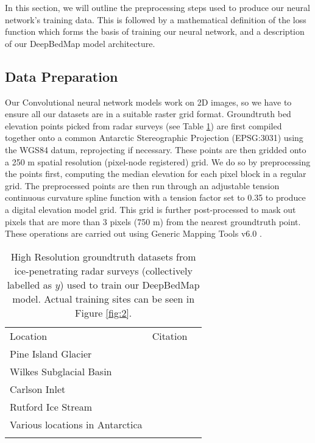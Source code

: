 \documentclass[tc, manuscript]{copernicus}
\begin{document}
In this section, we will outline the preprocessing steps used to produce our neural network's training data.
This is followed by a mathematical definition of the loss function which forms the basis of training our neural network, and a description of our DeepBedMap model architecture.

\subsection{Data Preparation}

Our Convolutional neural network models work on 2D images, so we have to ensure all our datasets are in a suitable raster grid format.
Groundtruth bed elevation points picked from radar surveys (see Table \ref{table:groundtruthdata}) are first compiled together onto a common Antarctic Stereographic Projection (EPSG:3031) using the WGS84 datum, reprojecting if necessary.
These points are then gridded onto a 250 m spatial resolution (pixel-node registered) grid.
We do so by preprocessing the points first, computing the median elevation for each pixel block in a regular grid.
The preprocessed points are then run through an adjustable tension continuous curvature spline function with a tension factor set to 0.35 to produce a digital elevation model grid.
This grid is further post-processed to mask out pixels that are more than 3 pixels (750 m) from the nearest groundtruth point.
These operations are carried out using Generic Mapping Tools v6.0 \citep[GMT6,][]{WesselGenericMappingTools2019}.

\begin{table}[ht]
  \caption{
    High Resolution groundtruth datasets from ice-penetrating radar surveys (collectively labelled as $y$) used to train our DeepBedMap model.
    Actual training sites can be seen in Figure \ref{fig:2}.
  }
  \label{table:groundtruthdata}
  \begin{tabular}{lcr}
  \tophline
  Location & Citation \\
  \middlehline
  Pine Island Glacier & \cite{BinghamDiverselandscapesPine2017} \\
  Wilkes Subglacial Basin & \cite{JordanHypothesismegaoutburstflooding2010} \\
  Carlson Inlet & \cite{KingIcestreamnot2011} \\
  Rutford Ice Stream & \cite{KingSubglaciallandformsRutford2016} \\
  Various locations in Antarctica & \cite{ShiMultichannelCoherentRadar2010} \\
  \bottomhline
  \end{tabular}
  \belowtable{} %
\end{table}
\end{document}

